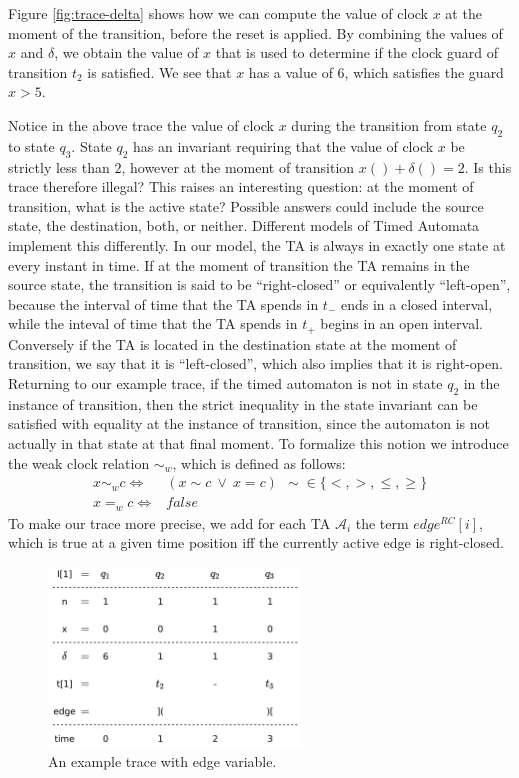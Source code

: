 \documentclass[a4paper,12pt]{article}
\begin{document}
Figure \ref{fig:trace-delta} shows how we can compute the value of clock $x$ at
the moment of the transition, before the reset is applied. By combining the
values of $x$ and $\delta$, we obtain the value of $x$ that is used to determine
if the clock guard of transition $t_{2}$ is satisfied. We see that $x$ has a
value of 6, which satisfies the guard $x>5$.

Notice in the above trace the value of clock $x$ during the transition from
state $q_{2}$ to state $q_{3}$. State $q_{2}$ has an invariant requiring that
the value of clock $x$ be strictly less than $2$, however at the moment of
transition $x() + \delta() = 2$. Is this trace therefore illegal? This raises an
interesting question: at the moment of transition, what is the active state?
Possible answers could include the source state, the destination, both, or
neither. Different models of Timed Automata implement this
differently\cite{TODO-give-example}. In our model, the TA is always in exactly
one state at every instant in time. If at the moment of transition the TA
remains in the source state, the transition is said to be ``right-closed'' or
equivalently ``left-open'', because the interval of time that the TA spends in
\(t_{-}\) ends in a closed interval, while the inteval of time that the TA
spends in \(t_{+}\) begins in an open interval. Conversely if the TA is located
in the destination state at the moment of transition, we say that it is
``left-closed'', which also implies that it is right-open. Returning to our
example trace, if the timed automaton is not in state $q_{2}$ in the instance of
transition, then the strict inequality in the state invariant can be satisfied
with equality at the instance of transition, since the automaton is not actually
in that state at that final moment. To formalize this notion we introduce the
weak clock relation $\sim_{w}$, which is defined as follows:
\begin{align*}
  x \sim_{w} c  \iff & (x \sim c\ \lor\ x = c) \ \ \sim \in \{<,>,\leq,\geq\} \\
  x =_{w} c  \iff & false
\end{align*}
To make our trace more precise, we add for each TA $\mathcal{A}_{i}$ the term
$edge^{RC}[i]$, which is true at a given time position iff the currently active
edge is right-closed.

\begin{figure}[h]
  \centering
  \includegraphics[width=0.6\textwidth]{trace-shift-full}
  \caption{An example trace with edge variable.}
  \label{fig:trace-full}
\end{figure}
\end{document}
